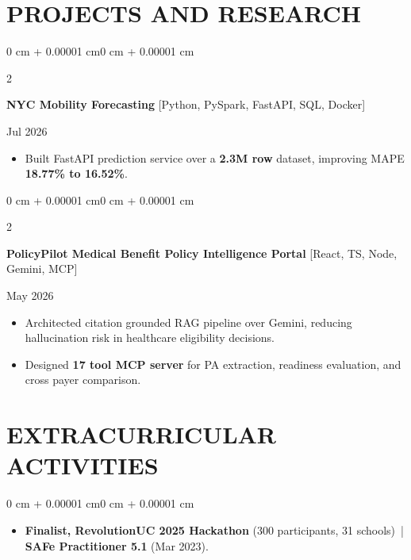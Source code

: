 \documentclass[10pt, letterpaper]{article}
\newenvironment{highlights}{
    \begin{itemize}[
        topsep=0.10 cm,
        parsep=0.06 cm,
        partopsep=0pt,
        itemsep=0.06 cm,
        leftmargin=12pt
    ]
}{
    \end{itemize}
}
\newenvironment{onecolentry}{
    \begin{adjustwidth}{0 cm + 0.00001 cm}{0 cm + 0.00001 cm}
}{
    \end{adjustwidth}
}
\newenvironment{twocolentry}[2][]{
    \onecolentry
    \def\secondColumn{#2}
    \setcolumnwidth{\fill, 4.5 cm}
    \begin{paracol}{2}
}{
    \switchcolumn \raggedleft \secondColumn
    \end{paracol}
    \endonecolentry
}
\begin{document}
\section{PROJECTS AND RESEARCH}
\begin{twocolentry}{Jul 2026}
\textbf{NYC Mobility Forecasting} [Python, PySpark, FastAPI, SQL, Docker]
\end{twocolentry}
\begin{highlights}
  \item Built FastAPI prediction service over a \textbf{2.3M row} dataset, improving MAPE \textbf{18.77\% to 16.52\%}.
\end{highlights}

\vspace{0.12 cm}

\begin{twocolentry}{May 2026}
\textbf{PolicyPilot Medical Benefit Policy Intelligence Portal} [React, TS, Node, Gemini, MCP]
\end{twocolentry}
\begin{highlights}
  \item Architected citation grounded RAG pipeline over Gemini, reducing hallucination risk in healthcare eligibility decisions.
  \item Designed \textbf{17 tool MCP server} for PA extraction, readiness evaluation, and cross payer comparison.
\end{highlights}

\section{EXTRACURRICULAR ACTIVITIES}
\begin{onecolentry}
\begin{highlights}
  \item \textbf{Finalist, RevolutionUC 2025 Hackathon} (300 participants, 31 schools) \,|\, \textbf{SAFe Practitioner 5.1} (Mar 2023).
\end{highlights}
\end{onecolentry}
\end{document}
